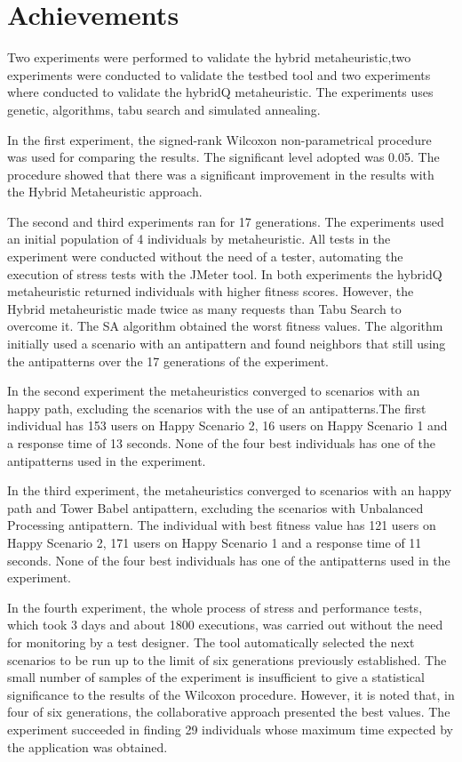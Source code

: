 \documentclass{report}
\begin{document}
\section{Achievements}

Two experiments were performed to validate the hybrid metaheuristic,two experiments were conducted to validate the testbed tool and two experiments where conducted to validate the hybridQ metaheuristic. The experiments uses genetic, algorithms, tabu search and simulated annealing.

In the first experiment, the signed-rank Wilcoxon non-parametrical procedure was used for comparing the results. The significant level adopted was 0.05. The procedure showed that there was a significant improvement in the results with the Hybrid Metaheuristic approach.

The second and third experiments ran for 17 generations. The experiments used an initial population of 4 individuals by metaheuristic. All tests in the experiment were conducted without the need of a tester, automating the execution of stress tests with the JMeter tool. In both experiments the hybridQ metaheuristic returned individuals with higher fitness scores. However, the Hybrid metaheuristic made twice as many requests than Tabu Search to overcome it. The SA algorithm obtained the worst fitness values. The algorithm initially used a scenario with an antipattern and found neighbors that still using the antipatterns over the 17 generations of the experiment.

In the second experiment the metaheuristics converged to scenarios with an happy path, excluding the scenarios with the use of an antipatterns.The first individual has 153 users on Happy Scenario 2, 16 users on Happy Scenario 1 and a response time of 13 seconds. None of the four best individuals has one of the antipatterns used in the experiment.


In the third experiment,  the metaheuristics converged to scenarios with an happy path and Tower Babel antipattern, excluding the scenarios with Unbalanced Processing antipattern.  The individual with best fitness value has 121 users on Happy Scenario 2, 171 users on Happy Scenario 1 and a response time of 11 seconds. None of the four best individuals has one of the antipatterns used in the experiment.


In the fourth experiment, the whole process of stress and performance tests, which took 3 days and about 1800 executions, was carried out without the need for monitoring by a test designer. The tool automatically selected the next scenarios to be run up to the limit of six generations previously established. The small number of samples of the experiment is insufficient to give a statistical significance to the results of the Wilcoxon procedure. However, it is noted that, in four of six generations, the collaborative approach presented the best values. The experiment succeeded in finding 29 individuals whose maximum time expected by the application was obtained.
\end{document}
